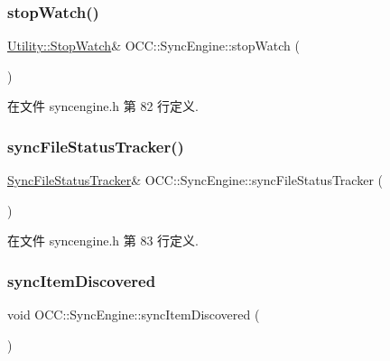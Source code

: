 \subsubsection{\texorpdfstring{stop\+Watch()}{stopWatch()}}
{\footnotesize\ttfamily \hyperlink{class_o_c_c_1_1_utility_1_1_stop_watch}{Utility\+::\+Stop\+Watch}\& O\+C\+C\+::\+Sync\+Engine\+::stop\+Watch (\begin{DoxyParamCaption}{ }\end{DoxyParamCaption})}



在文件 syncengine.\+h 第 82 行定义.

\mbox{\label{class_o_c_c_1_1_sync_engine_aa58939a62b5443a4453215d2d19e7697}} 
\subsubsection{\texorpdfstring{sync\+File\+Status\+Tracker()}{syncFileStatusTracker()}}
{\footnotesize\ttfamily \hyperlink{class_o_c_c_1_1_sync_file_status_tracker}{Sync\+File\+Status\+Tracker}\& O\+C\+C\+::\+Sync\+Engine\+::sync\+File\+Status\+Tracker (\begin{DoxyParamCaption}{ }\end{DoxyParamCaption})}



在文件 syncengine.\+h 第 83 行定义.

\mbox{\label{class_o_c_c_1_1_sync_engine_a3c4f0963b5256cabb90d13b82c0a7c7c}} 
\subsubsection{\texorpdfstring{sync\+Item\+Discovered}{syncItemDiscovered}}
{\footnotesize\ttfamily void O\+C\+C\+::\+Sync\+Engine\+::sync\+Item\+Discovered (\begin{DoxyParamCaption}\item[{const \hyperlink{class_o_c_c_1_1_sync_file_item}{Sync\+File\+Item} \&}]{ }\end{DoxyParamCaption})\hspace{0.3cm}{\ttfamily [signal]}}

